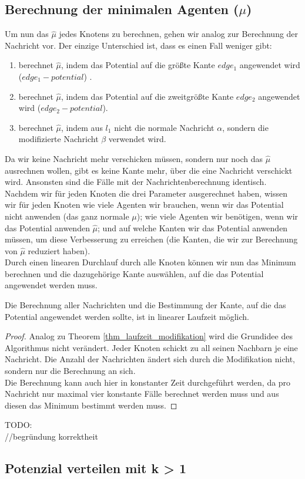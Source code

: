 	
	\subsection*{Berechnung der minimalen Agenten ($\mu$)}
	
	Um nun das $\hat{\mu}$ jedes Knotens zu berechnen, gehen wir analog zur Berechnung der Nachricht vor. Der einzige Unterschied ist, dass es einen Fall weniger gibt: 
	\begin{enumerate}
		\item berechnet $\hat{\mu}$, indem das Potential auf die größte Kante $edge_{1}$ angewendet wird ($edge_{1} - potential$) .
		\item berechnet $\hat{\mu}$, indem das Potential auf die zweitgrößte Kante $edge_{2}$ angewendet wird ($edge_{2} - potential$).
		\item berechnet $\hat{\mu}$, indem aus $l_{1}$ nicht die normale Nachricht $\alpha$, sondern die modifizierte Nachricht $\beta$ verwendet wird.
	\end{enumerate}
	Da wir keine Nachricht mehr verschicken müssen, sondern nur noch das $\hat{\mu}$ ausrechnen wollen, gibt es keine Kante mehr, über die eine Nachricht verschickt wird. Ansonsten sind die Fälle mit der Nachrichtenberechnung identisch.\\
	Nachdem wir für jeden Knoten die drei Parameter ausgerechnet haben, wissen wir für jeden Knoten wie viele Agenten wir brauchen, wenn wir das Potential nicht anwenden (das ganz normale $\mu$); wie viele Agenten wir benötigen, wenn wir das Potential anwenden $\hat{\mu}$; und auf welche Kanten wir das Potential anwenden müssen, um diese Verbesserung zu erreichen (die Kanten, die wir zur Berechnung von $\hat{\mu}$ reduziert haben).\\
	Durch einen linearen Durchlauf durch alle Knoten können wir nun das Minimum berechnen und die dazugehörige Kante auswählen, auf die das Potential angewendet werden muss.
	\begin{theorem}
		Die Berechnung aller Nachrichten und die Bestimmung der Kante, auf die das Potential angewendet werden sollte, ist in linearer Laufzeit möglich.
	\end{theorem}
	\begin{proof}
		Analog zu Theorem \ref{thm_laufzeit_modifikation} wird die Grundidee des Algorithmus nicht verändert. Jeder Knoten schickt zu all seinen Nachbarn je eine Nachricht. Die Anzahl der Nachrichten ändert sich durch die Modifikation nicht, sondern nur die Berechnung an sich.\\Die Berechnung kann auch hier in konstanter Zeit durchgeführt werden, da pro Nachricht nur maximal vier konstante Fälle berechnet werden muss und aus diesen das Minimum bestimmt werden muss.
	\end{proof}
	TODO:\\
	//begründung korrektheit

\subsection{Potenzial verteilen mit k > 1}